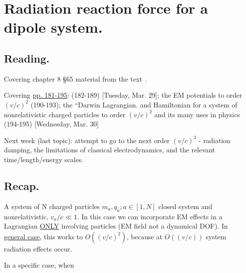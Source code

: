 %
%

\chapter{Radiation reaction force for a dipole system.}
\label{chap:relativisticElectrodynamicsL26}
{}
\date{April 5, 2011}

\beginArtNoToc

\section{Reading.}

Covering chapter 8 \S 65 material from the text \cite{landau1980classical}.

Covering \href{http://www.physics.utoronto.ca/~poppitz/epoppitz/PHY450_files/RelEMpp181-195.pdf}{pp. 181-195}: (182-189) [Tuesday, Mar. 29]; the EM potentials to order $(v/c)^2$ (190-193); the ``Darwin Lagrangian.  and Hamiltonian for a system of nonrelativistic charged particles to order $(v/c)^2$ and its many uses in physics (194-195) [Wednesday, Mar. 30]

Next week (last topic): attempt to go to the next order $(v/c)^3$ - radiation damping, the limitations of classical electrodynamics, and the relevant time/length/energy scales.

\section{Recap.}

A system of N charged particles $m_a, q_a ; a \in [1, N]$ closed system and nonrelativistic, $v_a/c \ll 1$.  In this case we can incorporate EM effects in a Lagrangian \underline{ONLY} involving particles (EM field not a dynamical DOF).  In \underline{general case}, this works to $O((v/c)^2)$, because at $O((v/c))$ system radiation effects occur.

In a specific case, when
 

